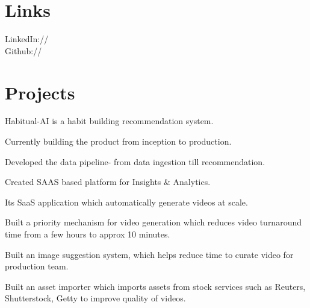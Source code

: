 \documentclass[]{deedy-resume-openfont}
\begin{document}
\begin{minipage}[t]{0.33\textwidth}

\section{Links} 
LinkedIn://  \href{https://www.linkedin.com/in/rohan-pithadiya}{} \\
Github:// \href{https://github.com/Rohanpithadiya}{} \\
\sectionsep

%
%

\end{minipage} 
\hfill
\begin{minipage}[t]{0.65\textwidth} 


\section{Projects}
\location{}
\vspace{\topsep} %
\begin{tightemize}
\item Habitual-AI is a habit building recommendation system.
\item Currently building the product from inception to production.
\item Developed the data pipeline- from data ingestion till recommendation.
\item Created SAAS based platform for Insights \& Analytics.
\end{tightemize}
\sectionsep

\location{}
\begin{tightemize}
\item  Its SaaS application which automatically generate videos at scale.
\item Built a priority mechanism for video generation which reduces video turnaround time from a few hours to approx 10 minutes.
\item Built an image suggestion system, which helps reduce time to curate video for production team.
\item Built an asset importer which imports assets from stock services such as Reuters, Shutterstock, Getty to improve quality of videos.
\end{tightemize}
\sectionsep


\end{minipage}
\end{document}
